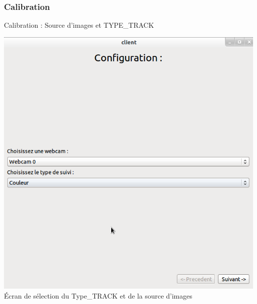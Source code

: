 \documentclass{beamer}
\begin{document}
            \subsubsection{Calibration}
            \begin{frame}{Calibration : Source d'images et TYPE\_TRACK}
                  \begin{center}
                        \includegraphics[scale=0.25]{Capture6.png}\\
                        Écran de sélection du Type\_TRACK et de la source d'images
                  \end{center}
            \end{frame}
\end{document}
